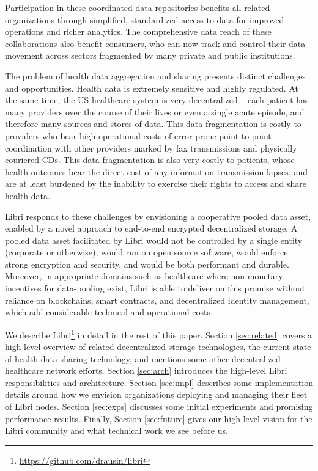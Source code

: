 \documentclass[10pt]{article}
\begin{document}
Participation in these coordinated data repositories benefits all related organizations through simplified, standardized access to data for improved operations and richer analytics. The comprehensive data reach of these collaborations also benefit consumers, who can now track and control their data movement across sectors fragmented by many private and public institutions.

The problem of health data aggregation and sharing presents distinct challenges and opportunities. Health data is extremely sensitive and highly regulated. At the same time, the US healthcare system is very decentralized -- each patient has many providers over the course of their lives or even a single acute episode, and therefore many sources and stores of data. This data fragmentation is costly to providers who bear high operational costs of error-prone point-to-point coordination with other providers marked by fax transmissions and physically couriered CDs. This data fragmentation is also very costly to patients, whose health outcomes bear the direct cost of any information transmission lapses, and are at least burdened by the inability to exercise their rights to access and share health data.

Libri responds to these challenges by envisioning a cooperative pooled data asset, enabled by a novel approach to end-to-end encrypted decentralized storage. A pooled data asset facilitated by Libri would not be controlled by a single entity (corporate or otherwise), would run on open source software, would enforce strong encryption and security, and would be both performant and durable. Moreover, in appropriate domains such as healthcare where non-monetary incentives for data-pooling exist, Libri is able to deliver on this promise without reliance on blockchains, smart contracts, and decentralized identity management, which add considerable technical and operational costs.

We describe Libri\footnote{\url{https://github.com/drausin/libri}} in detail in the rest of this paper. Section \ref{sec:related} covers a high-level overview of related decentralized storage technologies, the current state of health data sharing technology, and mentions some other decentralized healthcare network efforts. Section \ref{sec:arch} introduces the high-level Libri responsibilities and architecture. Section \ref{sec:impl} describes some implementation details around how we envision organizations deploying and managing their fleet of Libri nodes. Section \ref{sec:exps} discusses some initial experiments and promising performance results. Finally, Section \ref{sec:future} gives our high-level vision for the Libri community and what technical work we see before us.
\end{document}
